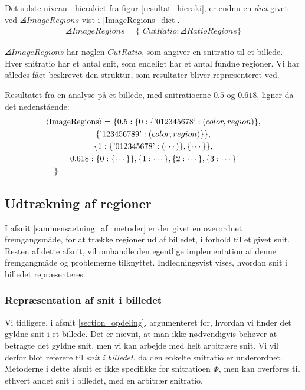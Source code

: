 {Det sidste niveau i hierakiet fra figur \ref{resultat_hieraki}, er endnu
en \emph{dict} givet ved $\angles{ImageRegions}$ vist i
\eqref{ImageRegions_dict}.
\begin{eqnarray}
    \angles{ImageRegions} = \{ \textit{~CutRatio} : \angles{RatioRegions} \}
    \label{ImageRegions_dict}
\end{eqnarray}

\noindent $\angles{ImageRegions}$ har nøglen $CutRatio$, som angiver en
snitratio til et billede. Hver snitratio har et antal snit, som endeligt
har et antal fundne regioner. Vi har således fået beskrevet den
struktur, som resultater bliver repræsenteret ved.

Resultatet fra en analyse på et billede, med snitratioerne $0.5$ og
$0.618$, ligner da det nedenstående:
\begin{multline}
    \angles{ImageRegions} = \{ 0.5 : \{ 0 : \{ \textrm{'012345678'} : (color, region) \},\\
                                            \{ \textrm{'123456789'} : (color, region) \}
                                            \},\\
                                            \{ 1 : \{ \textrm{'012345678'} : ( \cdots ) \}, 
                                            \{ \cdots \} \}, \\
                              0.618 : \{ 0 : \{ \cdots \} \}, \{ 1 :
                              \cdots \}, \{ 2 : \cdots \}, \{ 3 : \cdots
                              \} \\
    \shoveleft{\}}\shoveright{}
    \label{CutRegions_dict}
\end{multline}

\subsection{Udtrækning af regioner}
I afsnit \ref{sammensaetning_af_metoder} er der givet en overordnet
fremgangsmåde, for at trække regioner ud af billedet, i forhold til et
givet snit. Resten af dette afsnit, vil omhandle den egentlige
implementation af denne fremgangmåde og problemerne tilknyttet.
Indledningsvist vises, hvordan snit i billedet repræsenteres.

\subsubsection{Repræsentation af snit i billedet}
Vi tidligere, i afsnit \ref{section_opdeling}, argumenteret for, hvordan
vi finder det gyldne snit i et billede. Det er nævnt, at man ikke
nødvendigvis behøver at betragte det gyldne snit, men vi kan arbejde med
helt arbitrære snit. Vi vil derfor blot referere til \emph{snit i
billedet}, da den enkelte snitratio er underordnet. Metoderne i dette
afsnit er ikke specifikke for snitratioen $\varPhi$, men kan overføres
til ethvert andet snit i billedet, med en arbitrær snitratio.

}
